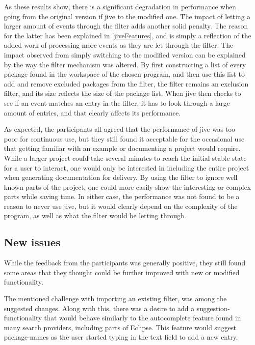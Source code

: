 As these results show, there is a significant degradation in performance when going from the original version if \gls{jive} to the modified one.
The impact of letting a larger amount of events through the filter adds another solid penalty.
The reason for the latter has been explained in \cref{jiveFeatures}, and is simply a reflection of the added work of processing more events as they are let through the filter.
The impact observed from simply switching to the modified version can be explained by the way the filter mechanism was altered.
By first constructing a list of every package found in the workspace of the chosen program, and then use this list to add and remove excluded packages from the filter, the filter remains an exclusion filter, and its size reflects the size of the package list.
When \gls{jive} then checks to see if an event matches an entry in the filter, it has to look through a large amount of entries, and that clearly affects its performance.

As expected, the participants all agreed that the performance of \gls{jive} was too poor for continuous use, but they still found it acceptable for the occasional use that getting familiar with an example or documenting a project would require.
While a larger project could take several minutes to reach the initial stable state for a user to interact, one would only be interested in including the entire project when generating documentation for delivery.
By using the filter to ignore well known parts of the project, one could more easily show the interesting or complex parts while saving time.
In either case, the performance was not found to be a reason to never use \gls{jive}, but it would clearly depend on the complexity of the program, as well as what the filter would be letting through.

\subsection{New issues}\label{jiveEvalIssues}
While the feedback from the participants was generally positive, they still found some areas that they thought could be further improved with new or modified functionality.

The mentioned challenge with importing an existing filter, was among the suggested changes.
Along with this, there was a desire to add a suggestion-functionality that would behave similarly to the autocomplete feature found in many search providers, including parts of Eclipse.
This feature would suggest package-names as the user started typing in the text field to add a new entry.

